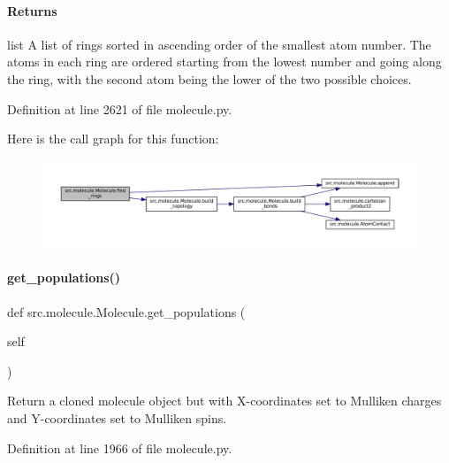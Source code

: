 \paragraph*{Returns }

list A list of rings sorted in ascending order of the smallest atom number. The atoms in each ring are ordered starting from the lowest number and going along the ring, with the second atom being the lower of the two possible choices. 

Definition at line 2621 of file molecule.\+py.

Here is the call graph for this function\+:
\nopagebreak
\begin{figure}[H]
\begin{center}
\leavevmode
\includegraphics[width=350pt]{classsrc_1_1molecule_1_1Molecule_abb42e2d8a17fac1eb2a8912e1ea3a9a7_cgraph}
\end{center}
\end{figure}
\mbox{\label{classsrc_1_1molecule_1_1Molecule_a692df3c446a2c9517ab4a3d2a9e7b373}} 
\paragraph{\texorpdfstring{get\+\_\+populations()}{get\_populations()}}
{\footnotesize\ttfamily def src.\+molecule.\+Molecule.\+get\+\_\+populations (\begin{DoxyParamCaption}\item[{}]{self }\end{DoxyParamCaption})}



Return a cloned molecule object but with X-\/coordinates set to Mulliken charges and Y-\/coordinates set to Mulliken spins. 



Definition at line 1966 of file molecule.\+py.

\mbox{\label{classsrc_1_1molecule_1_1Molecule_a36b472b4d2504123fab8083068f8315a}} 
